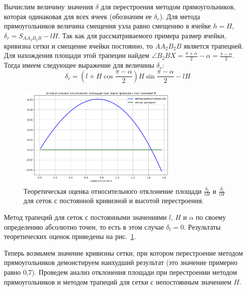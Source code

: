Вычислим величину значения $\delta$ для перестроения методом прямоугольников, которая одинаковая для всех ячеек (обозначим ее $\delta_r$).
Для метода прямоугольников величина смещения узла равно смещению в ячейке $h = H$, $\delta_r = S_{AA_2B_2B} - lH$.
Так как для рассматриваемого примера размер ячейки, кривизна сетки и смещение ячейки постоянно, то $AA_2B_2B$ является трапецией.
Для нахождения площади этой трапеции найдем $\angle B_2BX = \frac{\pi + \alpha}{2} - \alpha = \frac{\pi - \alpha}{2}$.
Тогда имеем следующее выражение для величины $\delta_r$:
\begin{equation}\label{eqn:text_1_remesh2_deltar}
	\delta_r = \left( l + H \cos \frac{\pi - \alpha}{2} \right) H \sin \frac{\pi - \alpha}{2} - lH
\end{equation}

\begin{figure}[h]
\onelinecaptionstrue
\centering
\includegraphics[width=0.7\textwidth]{pics/text_1_remesh_2d/rel_dev_for_const_H.png}
\caption{Теоретическая оценка относительного отклонение площади $\frac{\delta_r}{lH}$ и $\frac{\delta_t}{lH}$ для сеток с постоянной кривизной и высотой перестроения.}
\label{fig:text_1_remesh_2d_rel_dev_for_const_H}
\end{figure}

Метод трапеций для сеток с постоянными значениями $l$, $H$ и $\alpha$ по своему определению абсолютно точен, то есть в этом случае $\delta_t = 0$.
Результаты теоретических оценок приведены на рис.~\ref{fig:text_1_remesh_2d_rel_dev_for_const_H}.

Теперь возмьмем значение кривизны сетки, при котором перестроение методом прямоугольников демонстируем наихудший результат (это значение примерно равно 0,7).
Проведем анализ отклонения площади при перестроении методом прямоугольников и методом трапеций для сетки с непостоянным значением $H$.

